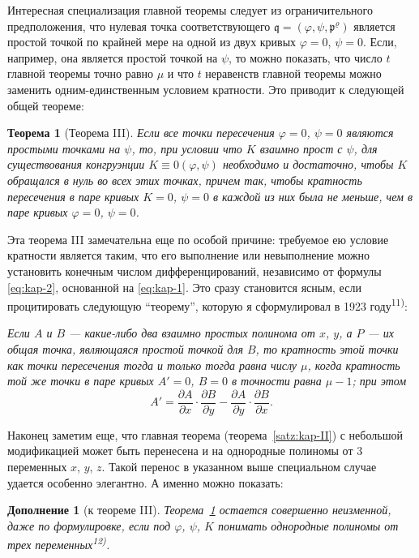 \documentclass[11pt]{article}
\theoremstyle{plain}
\newtheorem{satz}{Теорема}
\newtheorem{zusatz}{Дополнение}
\begin{document}
Интересная специализация главной теоремы следует из ограничительного
предположения, что нулевая точка соответствующего
$\mathfrak{q} = (\varphi, \psi, \mathfrak{p}^{\varrho})$ является
простой точкой по крайней мере на одной из двух кривых
$\varphi = 0$, $\psi = 0$. Если, например, она является простой
точкой на $\psi$, то можно показать, что число $t$ главной теоремы
точно равно $\mu$ и что $t$ неравенств главной теоремы можно
заменить одним-единственным условием кратности. Это приводит к
следующей общей теореме:

\begin{satz}[Теорема III]\label{satz:kap-III}
Если все точки пересечения $\varphi = 0$, $\psi = 0$ являются
простыми точками на $\psi$, то, при условии что $K$ взаимно прост с
$\psi$, для существования конгруэнции $K \equiv 0(\varphi, \psi)$
необходимо и достаточно, чтобы $K$ обращался в нуль во всех этих
точках, причем так, чтобы кратность пересечения в паре кривых
$K = 0$, $\psi = 0$ в каждой из них была не меньше, чем в паре
кривых $\varphi = 0$, $\psi = 0$.
\end{satz}

Эта теорема III замечательна еще по особой причине: требуемое ею
условие кратности является таким, что его выполнение или невыполнение
можно установить конечным числом дифференцирований, независимо от
формулы \eqref{eq:kap-2}, основанной на \eqref{eq:kap-1}. Это сразу
становится ясным, если процитировать следующую ``теорему'', которую
я сформулировал в 1923 году\textsuperscript{11)}:

\smallskip
\textit{Если $A$ и $B$ --- какие-либо два взаимно простых полинома
от $x$, $y$, а $P$ --- их общая точка, являющаяся простой точкой для
$B$, то кратность этой точки как точки пересечения тогда и только
тогда равна числу $\mu$, когда кратность той же точки в паре кривых
$A' = 0$, $B = 0$ в точности равна $\mu - 1$; при этом}
\[
A' = \frac{\partial A}{\partial x} \cdot \frac{\partial B}{\partial y} -
\frac{\partial A}{\partial y} \cdot \frac{\partial B}{\partial x}.
\]

Наконец заметим еще, что главная теорема
(теорема~\ref{satz:kap-II}) с небольшой модификацией может быть
перенесена и на однородные полиномы от 3 переменных $x$, $y$, $z$.
Такой перенос в указанном выше специальном случае удается особенно
элегантно. А именно можно показать:

\begin{zusatz}[к теореме III]
Теорема~\ref{satz:kap-III} остается совершенно неизменной, даже по
формулировке, если под $\varphi$, $\psi$, $K$ понимать однородные
полиномы от трех переменных\textsuperscript{12)}.
\end{zusatz}
\end{document}
